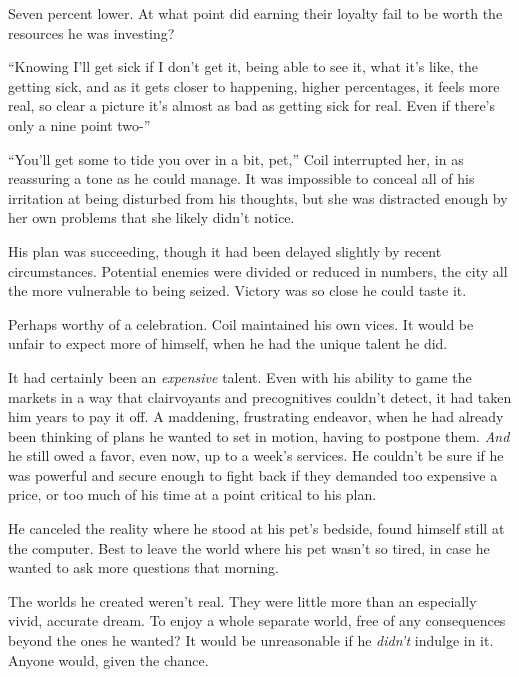 Seven percent lower.  At what point did earning their loyalty fail to be worth the resources he was investing?



``Knowing I'll get sick if I don't get it, being able to see it, what it's like, the getting sick, and as it gets closer to happening, higher percentages, it feels more real, so clear a picture it's almost as bad as getting sick for real.  Even if there's only a nine point two-''



``You'll get some to tide you over in a bit, pet,'' Coil interrupted her, in as reassuring a tone as he could manage.  It was impossible to conceal all of his irritation at being disturbed from his thoughts, but she was distracted enough by her own problems that she likely didn't notice.



His plan was succeeding, though it had been delayed slightly by recent circumstances.  Potential enemies were divided or reduced in numbers, the city all the more vulnerable to being seized.  Victory was so close he could taste it.



Perhaps worthy of a celebration.  Coil maintained his own vices.  It would be unfair to expect more of himself, when he had the unique talent he did.



It had certainly been an \emph{expensive} talent.  Even with his ability to game the markets in a way that clairvoyants and precognitives couldn't detect, it had taken him years to pay it off.  A maddening, frustrating endeavor, when he had already been thinking of plans he wanted to set in motion, having to postpone them.  \emph{And} he still owed a favor, even now, up to a week's services.  He couldn't be sure if he was powerful and secure enough to fight back if they demanded too expensive a price, or too much of his time at a point critical to his plan.



He canceled the reality where he stood at his pet's bedside, found himself still at the computer.  Best to leave the world where his pet wasn't so tired, in case he wanted to ask more questions that morning.



The worlds he created weren't real.  They were little more than an especially vivid, accurate dream.  To enjoy a whole separate world, free of any consequences beyond the ones he wanted?  It would be unreasonable if he \emph{didn't} indulge in it.  Anyone would, given the chance.



